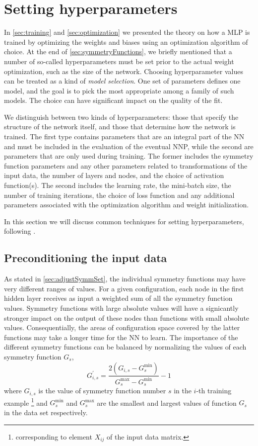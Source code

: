 \documentclass[twoside,english]{uiofysmaster}
\begin{document}
\section{Setting hyperparameters}
In \autoref{sec:training} and \autoref{sec:optimization} we presented the theory on how a MLP is trained 
by optimizing the weights and biases using an optimization algorithm of choice. 
At the end of \autoref{sec:symmetryFunctions}, we briefly mentioned that a number of so-called hyperparameters must be set
prior to the actual weight optimization, such as the size of the network. 
Choosing hyperparameter values can be treated as a
kind of \textit{model selection}. One set of parameters defines one model, and the goal is to pick the most appropriate 
among a family of such models. The choice can have significant impact on the quality of the fit. 

We distinguish between two kinds of hyperparameters: those that specify the structure of the 
network itself, and those that determine how the network is trained. 
The first type contains parameters that are an integral part of the NN and must be included in the evaluation of the eventual NNP, 
while the second are parameters that are only used during training. The former includes the symmetry function parameters
and any other parameters related to transformations of the input data, the number of layers and nodes, and the choice of 
activation function(s). The second includes 
the learning rate, the mini-batch size, the number of training iterations, the choice of loss function and any additional 
parameters associated with the optimization algorithm and weight initialization.

In this section we will discuss common techniques for setting hyperparameters, following \cite{Bengio12}. 

\subsection{Preconditioning the input data} \label{sec:transformInputData}
As stated in \autoref{sec:adjustSymmSet}, the individual symmetry functions may have very different ranges of values. 
For a given configuration, each node in the first hidden layer receives as input a weighted sum of all the symmetry function values.
Symmetry functions with large absolute values will have a signicantly stronger impact on the output of these nodes than 
functions with small absolute values. Consequentially, the areas of configuration space covered by the latter functions
may take a longer time for the NN to learn. The importance of the different symmetry functions can be balanced
by normalizing the values \cite{Behler15} of each symmetry function $G_s$, 
\begin{equation}
 G_{i,s}^\prime = \frac{2(G_{i,s} - G^{\min}_s)} {G^{\max}_s - G^{\min}_s} - 1
 \label{scalingInputData}
\end{equation}
where $G_{i,s}$ is the value of symmetry function number $s$ in the $i$-th training example 
\footnote{corresponding to element $X_{ij}$ of the input data matrix.} and
$G_s^{\min}$ and $G_s^{\max}$ are the smallest and largest values of function $G_s$ in the data set respectively.
\end{document}
